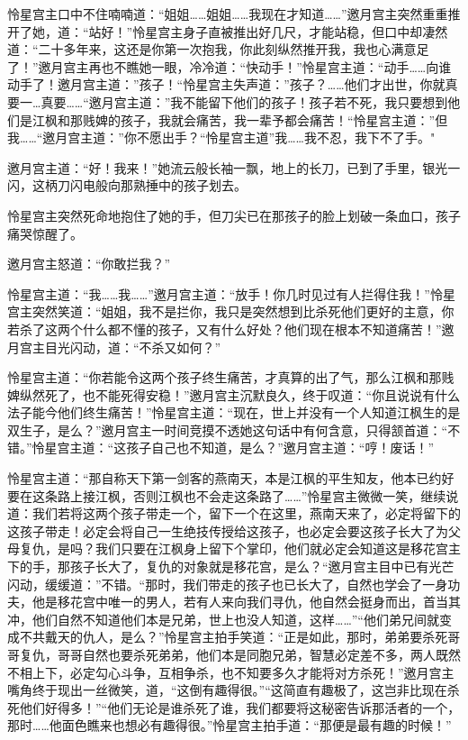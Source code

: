 \documentclass[12pt,oneside]{book}
\begin{document}
怜星宫主口中不住喃喃道：``姐姐\ldots\ldots 姐姐\ldots\ldots 我现在才知道\ldots\ldots{}''邀月宫主突然重重推开了她，道：``站好！''怜星宫主身子直被推出好几尺，才能站稳，但口中却凄然道：``二十多年来，这还是你第一次抱我，你此刻纵然推开我，我也心满意足了！''邀月宫主再也不瞧她一眼，冷冷道：``快动手！''怜星宫主道：``动手\ldots\ldots 向谁动手了！邀月宫主道：''孩子！``怜星宫主失声道：''孩子？\ldots\ldots 他们才出世，你就真要一\ldots 真要\ldots\ldots{}``邀月宫主道：''我不能留下他们的孩子！孩子若不死，我只要想到他们是江枫和那贱婢的孩子，我就会痛苦，我一辈予都会痛苦！``怜星宫主道：''但我\ldots\ldots{}``邀月宫主道：''你不愿出手？``怜星宫主道''我\ldots\ldots 我不忍，我下不了手。"

邀月宫主道：``好！我来！''她流云般长袖一飘，地上的长刀，已到了手里，银光一闪，这柄刀闪电般向那熟捶中的孩子划去。

怜星宫主突然死命地抱住了她的手，但刀尖已在那孩子的脸上划破一条血口，孩子痛哭惊醒了。

邀月宫主怒道：``你敢拦我？''

怜星宫主道：``我\ldots\ldots 我\ldots\ldots{}''邀月宫主道：``放手！你几时见过有人拦得住我！''怜星宫主突然笑道：``姐姐，我不是拦你，我只是突然想到比杀死他们更好的主意，你若杀了这两个什么都不懂的孩子，又有什么好处？他们现在根本不知道痛苦！''邀月宫主目光闪动，道：``不杀又如何？''

怜星宫主道：``你若能令这两个孩子终生痛苦，才真算的出了气，那么江枫和那贱婢纵然死了，也不能死得安稳！''邀月宫主沉默良久，终于叹道：``你且说说有什么法子能今他们终生痛苦！''怜星宫主道：``现在，世上并没有一个人知道江枫生的是双生子，是么？''邀月宫主一时间竞摸不透她这句话中有何含意，只得颔首道：``不错。''怜星宫主道：``这孩子自己也不知道，是么？''邀月宫主道：``哼！废话！''

怜星宫主道：``那自称天下第一剑客的燕南天，本是江枫的平生知友，他本已约好要在这条路上接江枫，否则江枫也不会走这条路了\ldots\ldots{}''怜星宫主微微一笑，继续说道：我们若将这两个孩子带走一个，留下一个在这里，燕南天来了，必定将留下的这孩子带走！必定会将自己一生绝技传授给这孩子，也必定会要这孩子长大了为父母复仇，是吗？我们只要在江枫身上留下个掌印，他们就必定会知道这是移花宫主下的手，那孩子长大了，复仇的对象就是移花宫，是么？``邀月宫主目中已有光芒闪动，缓缓道：''不错。``那时，我们带走的孩子也已长大了，自然也学会了一身功夫，他是移花宫中唯一的男人，若有人来向我们寻仇，他自然会挺身而出，首当其冲，他们自然不知道他们本是兄弟，世上也没人知道，这样\ldots\ldots{}''``他们弟兄间就变成不共戴天的仇人，是么？''怜星宫主拍手笑道：``正是如此，那时，弟弟要杀死哥哥复仇，哥哥自然也要杀死弟弟，他们本是同胞兄弟，智慧必定差不多，两人既然不相上下，必定勾心斗争，互相争杀，也不知要多久才能将对方杀死！''邀月宫主嘴角终于现出一丝微笑，道，``这倒有趣得很。''``这简直有趣极了，这岂非比现在杀死他们好得多！''``他们无论是谁杀死了谁，我们都要将这秘密告诉那活者的一个，那时\ldots\ldots 他面色瞧来也想必有趣得很。''怜星宫主拍手道：``那便是最有趣的时候！''
\end{document}
